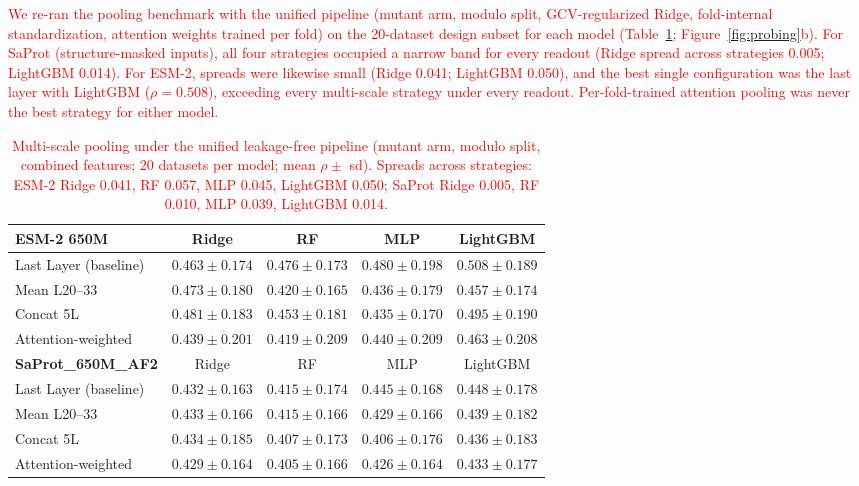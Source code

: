 \documentclass[11pt,a4paper]{article}
\newcommand{\revised}[1]{\textcolor{red}{#1}}
\begin{document}
\revised{We re-ran the pooling benchmark with the unified pipeline (mutant arm, modulo
split, GCV-regularized Ridge, fold-internal standardization, attention weights trained
per fold) on the 20-dataset design subset for each model
(Table~\ref{tab:pooling}; Figure~\ref{fig:probing}b).
For SaProt (structure-masked inputs), all four strategies occupied a narrow band for
every readout (Ridge spread across strategies 0.005; LightGBM 0.014). For ESM-2,
spreads were likewise small (Ridge 0.041; LightGBM 0.050), and the best single
configuration was the last layer with LightGBM ($\rho = 0.508$), exceeding every
multi-scale strategy under every readout. Per-fold-trained attention pooling was
never the best strategy for either model.}

\begin{table}[ht]
\centering
\caption{\revised{Multi-scale pooling under the unified leakage-free pipeline (mutant
arm, modulo split, combined features; 20 datasets per model; mean $\rho \pm$ sd).
Spreads across strategies: ESM-2 Ridge 0.041, RF 0.057, MLP 0.045, LightGBM 0.050;
SaProt Ridge 0.005, RF 0.010, MLP 0.039, LightGBM 0.014.}}
\label{tab:pooling}
\begin{tabular}{lcccc}
\toprule
\textbf{ESM-2 650M} & Ridge & RF & MLP & LightGBM \\
\midrule
Last Layer (baseline) & $0.463 \pm 0.174$ & $0.476 \pm 0.173$ & $0.480 \pm 0.198$ & $\mathbf{0.508} \pm 0.189$ \\
Mean L20--33          & $0.473 \pm 0.180$ & $0.420 \pm 0.165$ & $0.436 \pm 0.179$ & $0.457 \pm 0.174$ \\
Concat 5L             & $0.481 \pm 0.183$ & $0.453 \pm 0.181$ & $0.435 \pm 0.170$ & $0.495 \pm 0.190$ \\
Attention-weighted    & $0.439 \pm 0.201$ & $0.419 \pm 0.209$ & $0.440 \pm 0.209$ & $0.463 \pm 0.208$ \\
\midrule
\textbf{SaProt\_650M\_AF2} & Ridge & RF & MLP & LightGBM \\
\midrule
Last Layer (baseline) & $0.432 \pm 0.163$ & $0.415 \pm 0.174$ & $0.445 \pm 0.168$ & $\mathbf{0.448} \pm 0.178$ \\
Mean L20--33          & $0.433 \pm 0.166$ & $0.415 \pm 0.166$ & $0.429 \pm 0.166$ & $0.439 \pm 0.182$ \\
Concat 5L             & $0.434 \pm 0.185$ & $0.407 \pm 0.173$ & $0.406 \pm 0.176$ & $0.436 \pm 0.183$ \\
Attention-weighted    & $0.429 \pm 0.164$ & $0.405 \pm 0.166$ & $0.426 \pm 0.164$ & $0.433 \pm 0.177$ \\
\bottomrule
\end{tabular}
\end{table}
\end{document}
